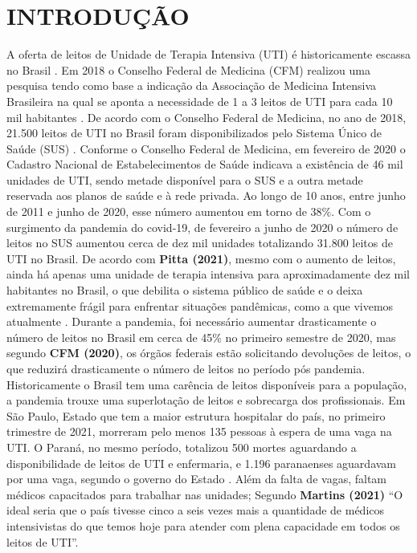 \documentclass[12pt]{article}
\begin{document}
\section{INTRODUÇÃO}
A oferta de leitos de Unidade de Terapia Intensiva (UTI) é historicamente escassa no Brasil \cite{murthy2015intensive}. Em 2018 o Conselho Federal de Medicina (CFM) realizou uma pesquisa tendo como base a indicação da Associação de Medicina Intensiva Brasileira na qual se aponta a necessidade de 1 a 3 leitos de UTI para cada 10 mil habitantes \cite{domingues2018numero}. De acordo com o Conselho Federal de Medicina, no ano de 2018, 21.500 leitos de UTI no Brasil foram disponibilizados pelo Sistema Único de Saúde (SUS) \cite{cfm2018,cfm2020}.
Conforme o Conselho Federal de Medicina, em fevereiro de 2020 o Cadastro Nacional de Estabelecimentos de Saúde indicava a existência de 46 mil unidades de UTI, sendo metade disponível para o SUS e a outra metade reservada aos planos de saúde e à rede privada. Ao longo de 10 anos, entre junho de 2011 e junho de 2020, esse número aumentou em torno de 38\%. Com o surgimento da pandemia do covid-19, de fevereiro a junho de 2020 o número de leitos no SUS aumentou cerca de dez mil unidades totalizando 31.800 leitos de UTI no Brasil.
De acordo com \textbf{Pitta (2021)}, mesmo com o aumento de leitos, ainda há apenas uma unidade de terapia intensiva para aproximadamente dez mil habitantes no Brasil, o que debilita o sistema público de saúde e o deixa extremamente frágil para enfrentar situações pandêmicas, como a que vivemos atualmente \cite{pimentel2020design}. Durante a pandemia, foi necessário aumentar drasticamente o número de leitos no Brasil em cerca de 45\% no primeiro semestre de 2020, mas segundo \textbf{CFM (2020)}, os órgãos federais estão solicitando devoluções de leitos, o que reduzirá drasticamente o número de leitos no período pós pandemia.
Historicamente o Brasil tem uma carência de leitos disponíveis para a população, a pandemia trouxe uma superlotação de leitos e sobrecarga dos profissionais. Em São Paulo, Estado que tem a maior estrutura hospitalar do país, no primeiro trimestre de 2021, morreram pelo menos 135 pessoas à espera de uma vaga na UTI. O Paraná, no mesmo período, totalizou 500 mortes aguardando a disponibilidade de leitos de UTI e enfermaria, e 1.196 paranaenses aguardavam por uma vaga, segundo o governo do Estado \cite{fundacaooswaldocruz2021}. Além da falta de vagas, faltam médicos capacitados para trabalhar nas unidades; Segundo \textbf{Martins (2021)} “O ideal seria que o país tivesse cinco a seis vezes mais a quantidade de médicos intensivistas do que temos hoje para atender com plena capacidade em todos os leitos de UTI”.
\end{document}
